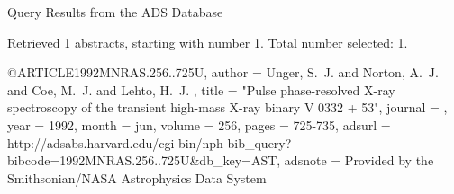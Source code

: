 Query Results from the ADS Database


Retrieved 1 abstracts, starting with number 1.  Total number selected: 1.

@ARTICLE{1992MNRAS.256..725U,
   author = {{Unger}, S.~J. and {Norton}, A.~J. and {Coe}, M.~J. and {Lehto}, H.~J.
	},
    title = "{Pulse phase-resolved X-ray spectroscopy of the transient high-mass X-ray binary V 0332 + 53}",
  journal = {\mnras},
     year = 1992,
    month = jun,
   volume = 256,
    pages = {725-735},
   adsurl = {http://adsabs.harvard.edu/cgi-bin/nph-bib_query?bibcode=1992MNRAS.256..725U&db_key=AST},
  adsnote = {Provided by the Smithsonian/NASA Astrophysics Data System}
}


